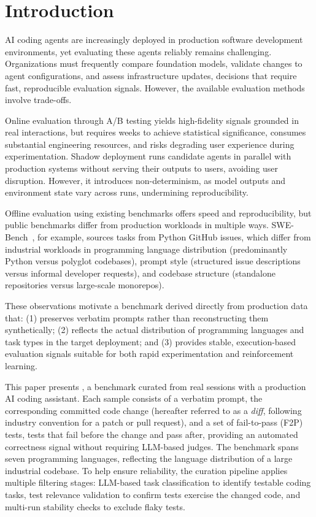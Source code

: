 \section{Introduction}
\label{sec:intro}

AI coding agents are increasingly deployed in production software development environments, yet evaluating these agents reliably remains challenging.
Organizations must frequently compare foundation models, validate changes to agent configurations, and assess infrastructure updates, decisions that require fast, reproducible evaluation signals.
However, the available evaluation methods involve trade-offs.

Online evaluation through A/B testing yields high-fidelity signals grounded in real interactions, but requires weeks to achieve statistical significance, consumes substantial engineering resources, and risks degrading user experience during experimentation.
Shadow deployment runs candidate agents in parallel with production systems without serving their outputs to users, avoiding user disruption. However, it introduces non-determinism, as model outputs and environment state vary across runs, undermining reproducibility.

Offline evaluation using existing benchmarks offers speed and reproducibility, but public benchmarks differ from production workloads in multiple ways.
SWE-Bench~\cite{jimenezSWEbenchCanLanguage2024}, for example, sources tasks from Python GitHub issues, which differ from industrial workloads in programming language distribution (predominantly Python versus polyglot codebases), prompt style (structured issue descriptions versus informal developer requests), and codebase structure (standalone repositories versus large-scale monorepos).

These observations motivate a benchmark derived directly from production data that:
(1) preserves verbatim prompts rather than reconstructing them synthetically;
(2) reflects the actual distribution of programming languages and task types in the target deployment; and
(3) provides stable, execution-based evaluation signals suitable for both rapid experimentation and reinforcement learning.

This paper presents \benchmark{}, a benchmark curated from real sessions with a production AI coding assistant.
Each sample consists of a verbatim prompt, the corresponding committed code change (hereafter referred to as a \emph{diff}, following industry convention for a patch or pull request), and a set of fail-to-pass (F2P) tests, tests that fail before the change and pass after, providing an automated correctness signal without requiring LLM-based judges.
The benchmark spans seven programming languages, reflecting the language distribution of a large industrial codebase.
To help ensure reliability, the curation pipeline applies multiple filtering stages: LLM-based task classification to identify testable coding tasks, test relevance validation to confirm tests exercise the changed code, and multi-run stability checks to exclude flaky tests.

